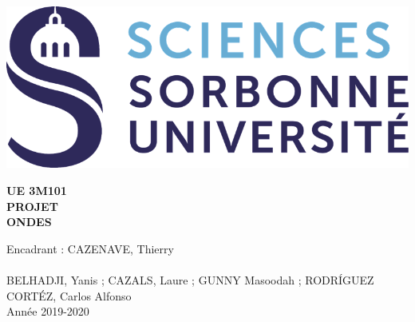 \documentclass[10pt,a4paper]{article}
\author{BELHADJI, Yanis ; CAZALS, Laure ; GUNNY Masoodah ; RODRÍGUEZ CORTÉZ, Carlos Alfonso}
\title{}
\begin{document}
\begin{titlepage}
\includegraphics[scale=0.4]{logo.png}
\begin{center}
\vspace*{7cm}
{\Huge  \textbf{UE 3M101}}
\\
\vspace{1cm}
 \huge \textbf{PROJET}
 \\
 \vspace{1cm}
 \LARGE \textbf{ONDES}
 \vfill

{\large  Encadrant : CAZENAVE, Thierry}
\\~\\
{\normalsize BELHADJI, Yanis ; CAZALS, Laure ; GUNNY Masoodah ; RODRÍGUEZ CORTÉZ, Carlos Alfonso}
\\
\vspace{1cm}
{\normalsize Année 2019-2020}
 \end{center}

\end{titlepage}
 
 
\thispagestyle{empty}
\vspace*{\fill}
\renewcommand{\contentsname}{\Huge Sommaire}
\tableofcontents
\vspace*{\fill}
\pagebreak
\setcounter{page}{1}
\end{document}
